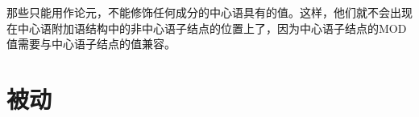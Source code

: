 那些只能用作论元，不能修饰任何成分的中心语具有的\modvc 值。这样，他们就不会出现在中心语附加语结构中的非中心语子结点的位置上了，因为中心语子结点的MOD值需要与中心语子结点的\synsemc 值兼容。

\section{被动}
\label{Abschnitt-HPSG-Passiv}\label{sec-hpsg-passive}

